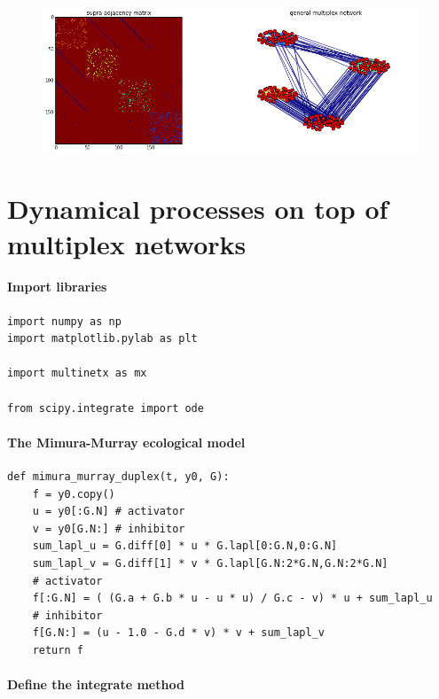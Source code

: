 \documentclass[11pt]{article}
\begin{document}
\begin{figure}[htbp]
\centering
\includegraphics[width=\textwidth]{output_57_0.png}
\end{figure}



\section{Dynamical processes on top of multiplex networks}

\paragraph{Import libraries}\label{import-libraries}

\begin{verbatim}
import numpy as np
import matplotlib.pylab as plt

import multinetx as mx

from scipy.integrate import ode
\end{verbatim}

\paragraph{The Mimura-Murray ecological
model}\label{the-mimura-murray-ecological-model}

\begin{verbatim}
def mimura_murray_duplex(t, y0, G):
    f = y0.copy()    
    u = y0[:G.N] # activator
    v = y0[G.N:] # inhibitor    
    sum_lapl_u = G.diff[0] * u * G.lapl[0:G.N,0:G.N]   
    sum_lapl_v = G.diff[1] * v * G.lapl[G.N:2*G.N,G.N:2*G.N]    
    # activator
    f[:G.N] = ( (G.a + G.b * u - u * u) / G.c - v) * u + sum_lapl_u
    # inhibitor   
    f[G.N:] = (u - 1.0 - G.d * v) * v + sum_lapl_v
    return f 
\end{verbatim}

\paragraph{Define the integrate
method}\label{define-the-integrate-method}
\end{document}
